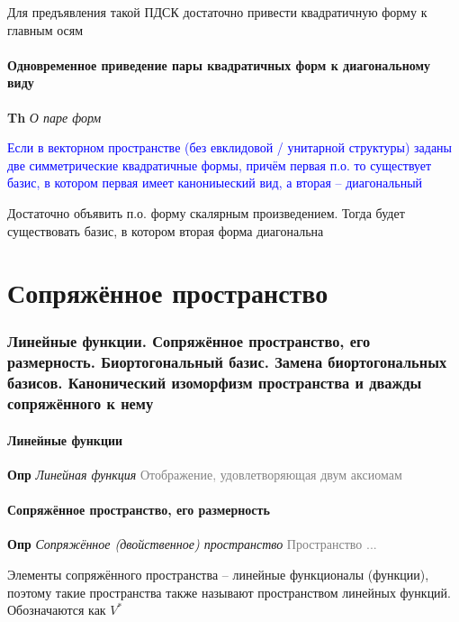 \documentclass[a4paper, 14pt]{article}
\begin{document}
    Для предъявления такой ПДСК достаточно привести квадратичную форму к главным осям
    
    \subsection{Одновременное приведение пары квадратичных форм к диагональному виду}
    
    \textbf{Th} \textit{О паре форм}
    
    \textcolor{blue}{Если в векторном пространстве (без евклидовой / унитарной структуры) заданы две симметрические
    квадратичные формы, причём первая п.о. то существует базис, в котором первая имеет канониыеский вид, а вторая --
    диагональный}
    
    Достаточно объявить п.о. форму скалярным произведением.
    Тогда будет существовать базис, в котором вторая форма диагональна
    
     \part*{Сопряжённое пространство}
    
    \section{Линейные функции.
    Сопряжённое пространство, его размерность.
    Биортогональный базис.
    Замена биортогональных базисов.
    Канонический изоморфизм пространства и дважды сопряжённого к нему}
    
    \subsection{Линейные функции}
    
    \textbf{Опр} \textit{Линейная функция} \textcolor{gray}{Отображение, удовлетворяющая двум аксиомам}
    
    \subsection{Сопряжённое пространство, его размерность}
    
    \textbf{Опр} \textit{Сопряжённое (двойственное) пространство} \textcolor{gray}{Пространство ...}
    
    Элементы сопряжённого пространства -- линейные функционалы (функции), поэтому такие пространства также называют
    пространством линейных функций.
    Обозначаются как $V^*$
    
\end{document}
